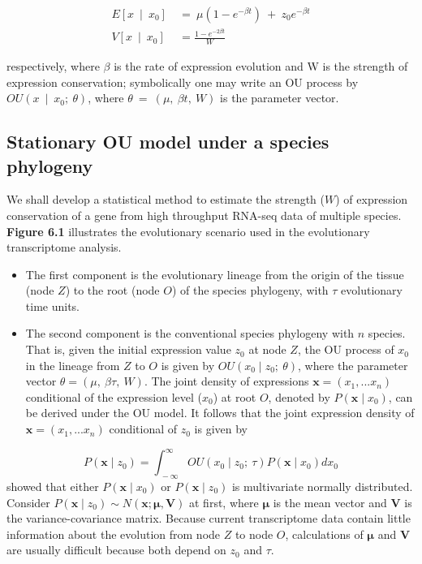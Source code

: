 \documentclass[]{book}
\providecommand{\tightlist}{%
  \setlength{\itemsep}{0pt}\setlength{\parskip}{0pt}}
\begin{document}
\[
\begin{split}
E\left[x\  \mid\  x_0\right]\  &=\  \mu\left(1-e^{-\beta t}\right)\  +\  z_0e^{-\beta t} \\
V\left[x\  \mid\  x_0\right]\  &=\frac{1-e^{-2\beta t}}{W}
\end{split}\tag{3.1}
\]

respectively, where \(\beta\) is the rate of expression evolution and W is the strength of expression conservation; symbolically one may write an OU process by \(OU\left(x\  \mid\  x_0;\  \theta\right)\), where \(\theta\  =\  \left(\mu,\  \beta t,\  W\right)\) is the parameter vector.

\hypertarget{stationary-ou-model-under-a-species-phylogeny}{%
\subsection{Stationary OU model under a species phylogeny}\label{stationary-ou-model-under-a-species-phylogeny}}

We shall develop a statistical method to estimate the strength (\(W\)) of expression conservation of a gene from high throughput RNA-seq data of multiple species. \textbf{Figure 6.1} illustrates the evolutionary scenario used in the evolutionary transcriptome analysis.

\begin{itemize}
\tightlist
\item
  The first component is the evolutionary lineage from the origin of the tissue (node \(Z\)) to the root (node \(O\)) of the species phylogeny, with \(\tau\) evolutionary time units.
\item
  The second component is the conventional species phylogeny with \(n\) species. That is, given the initial expression value \(z_0\) at node \(Z\), the OU process of \(x_0\) in the lineage from \(Z\) to \(O\) is given by \(OU\left(x_0\mid z_0;\  \theta\right)\), where the parameter vector \(\theta=\left(\mu,\  \beta\tau,\  W\right)\). The joint density of expressions \(\boldsymbol{x}=\left(x_1,...x_n\right)\) conditional of the expression level (\(x_0\)) at root \(O\), denoted by \(P\left(\boldsymbol{x}\mid x_0\right)\), can be derived under the OU model. It follows that the joint expression density of \(\boldsymbol{x}=\left(x_1,...x_n\right)\) conditional of \(z_0\) is given by
\end{itemize}

\[P\left(\boldsymbol{x}\mid z_0\right)=\int_{\  -\infty}^{\infty}OU\left(x_0\mid z_0;\  \tau\right)P\left(\boldsymbol{x}\mid x_0\right)dx_0\tag{3.2}\]
\citep{hansen1996} showed that either \(P\left(\boldsymbol{x}\mid x_0\right)\) or \(P\left(\boldsymbol{x}\mid z_0\right)\) is multivariate normally distributed. Consider \(P\left(\boldsymbol{x}\mid z_0\right)\sim N\left(\boldsymbol{x}; \boldsymbol{\mu}, \boldsymbol{V}\right)\) at first, where \(\boldsymbol{\mu}\) is the mean vector and \(\boldsymbol{V}\) is the variance-covariance matrix. Because current transcriptome data contain little information about the evolution from node \(Z\) to node \(O\), calculations of \(\boldsymbol{\mu}\) and \(\boldsymbol{V}\) are usually difficult because both depend on \(z_0\) and \(\tau\).
\end{document}
